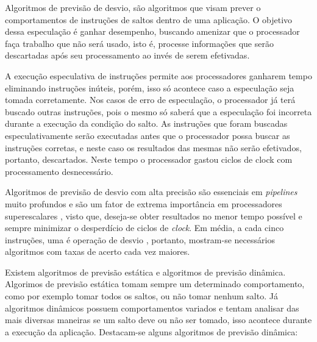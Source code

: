 \documentclass[12pt]{article}
\begin{document}
Algoritmos de previsão de desvio, são algoritmos que visam prever o comportamentos de instruções de saltos dentro de uma
aplicação. O objetivo dessa especulação é ganhar desempenho, buscando amenizar que o processador faça trabalho que não será
usado, isto é, processe informações que serão descartadas após seu processamento ao invés de serem efetivadas. 

A execução especulativa de instruções permite aos processadores ganharem tempo eliminando instruções inúteis, porém, isso só 
acontece caso a especulação seja tomada corretamente. Nos casos de erro de especulação, o processador já terá buscado outras 
instruções, pois o mesmo só saberá que a especulação foi incorreta durante a execução da condição do salto. As instruções que
foram buscadas especulativamente serão executadas antes que o processador possa buscar as instruções corretas, e neste caso os resultados
das mesmas não serão efetivados, portanto, descartados.
Neste tempo o processador gastou ciclos de clock com processamento desnecessário.

Algoritmos de previsão de desvio com alta precisão são essenciais em \textit{pipelines} muito profundos e são um fator de extrema
importância em processadores superescalares \cite{evers:96}, visto que, deseja-se
obter resultados no menor tempo possível e sempre minimizar o desperdício de ciclos de \textit{clock}. Em média, a cada cinco
instruções, uma é operação de desvio \cite{nicacio:06}, portanto, mostram-se necessários algoritmos com taxas de acerto cada
vez maiores.

Existem algoritmos de previsão estática e algoritmos de previsão dinâmica. Algorimos de previsão estática tomam sempre um determinado
comportamento, como por exemplo tomar todos os saltos, ou não tomar nenhum salto. Já algoritmos dinâmicos possuem comportamentos
variados e tentam analisar das mais diversas maneiras se um salto deve ou não ser tomado, isso acontece durante a execução da aplicação.
Destacam-se alguns algoritmos de previsão dinâmica:
\end{document}
